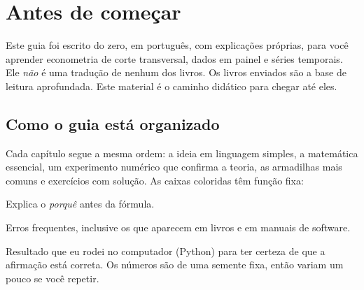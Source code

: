 \chapter*{Antes de começar}

Este guia foi escrito do zero, em português, com explicações próprias, para você aprender econometria de corte transversal, dados em painel e séries temporais. Ele \emph{não} é uma tradução de nenhum dos livros. Os livros enviados são a base de leitura aprofundada. Este material é o caminho didático para chegar até eles.

\section*{Como o guia está organizado}
Cada capítulo segue a mesma ordem: a ideia em linguagem simples, a matemática essencial, um experimento numérico que confirma a teoria, as armadilhas mais comuns e exercícios com solução. As caixas coloridas têm função fixa:

\begin{intuicao}[{Intuição}]
Explica o \emph{porquê} antes da fórmula.
\end{intuicao}
\begin{atencao}[{Armadilha}]
Erros frequentes, inclusive os que aparecem em livros e em manuais de software.
\end{atencao}
\begin{simulacao}
Resultado que eu rodei no computador (Python) para ter certeza de que a afirmação está correta. Os números são de uma semente fixa, então variam um pouco se você repetir.
\end{simulacao}

